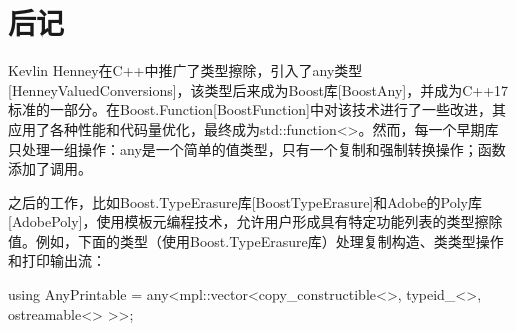 \section{后记}
Kevlin Henney在C++中推广了类型擦除，引入了any类型[HenneyValuedConversions]，该类型后来成为Boost库[BoostAny]，并成为C++17标准的一部分。在Boost.Function[BoostFunction]中对该技术进行了一些改进，其应用了各种性能和代码量优化，最终成为std::function<>。然而，每一个早期库只处理一组操作：any是一个简单的值类型，只有一个复制和强制转换操作；函数添加了调用。

之后的工作，比如Boost.TypeErasure库[BoostTypeErasure]和Adobe的Poly库[AdobePoly]，使用模板元编程技术，允许用户形成具有特定功能列表的类型擦除值。例如，下面的类型（使用Boost.TypeErasure库）处理复制构造、类类型操作和打印输出流：

\begin{cpp}
using AnyPrintable = any<mpl::vector<copy_constructible<>,
									typeid_<>,
									ostreamable<>
									>>;
\end{cpp}